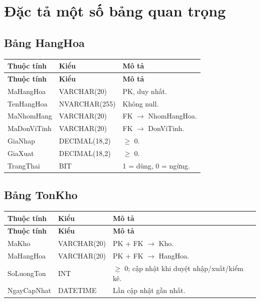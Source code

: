 \section{Đặc tả một số bảng quan trọng}

\subsection{Bảng HangHoa}

\begin{longtable}{|p{3cm}|p{3.5cm}|p{6cm}|}
\hline
\textbf{Thuộc tính} & \textbf{Kiểu} & \textbf{Mô tả} \\
\hline
\endfirsthead
\hline
\textbf{Thuộc tính} & \textbf{Kiểu} & \textbf{Mô tả} \\
\hline
\endhead
MaHangHoa & VARCHAR(20) & PK, duy nhất. \\
\hline
TenHangHoa & NVARCHAR(255) & Không null. \\
\hline
MaNhomHang & VARCHAR(20) & FK $\rightarrow$ NhomHangHoa. \\
\hline
MaDonViTinh & VARCHAR(20) & FK $\rightarrow$ DonViTinh. \\
\hline
GiaNhap & DECIMAL(18,2) & $\geq$ 0. \\
\hline
GiaXuat & DECIMAL(18,2) & $\geq$ 0. \\
\hline
TrangThai & BIT & 1 = dùng, 0 = ngừng. \\
\hline
\end{longtable}

\subsection{Bảng TonKho}

\begin{longtable}{|p{3cm}|p{3.5cm}|p{6cm}|}
\hline
\textbf{Thuộc tính} & \textbf{Kiểu} & \textbf{Mô tả} \\
\hline
\endfirsthead
\hline
\textbf{Thuộc tính} & \textbf{Kiểu} & \textbf{Mô tả} \\
\hline
\endhead
MaKho & VARCHAR(20) & PK + FK $\rightarrow$ Kho. \\
\hline
MaHangHoa & VARCHAR(20) & PK + FK $\rightarrow$ HangHoa. \\
\hline
SoLuongTon & INT & $\geq$ 0; cập nhật khi duyệt nhập/xuất/kiểm kê. \\
\hline
NgayCapNhat & DATETIME & Lần cập nhật gần nhất. \\
\hline
\end{longtable}

